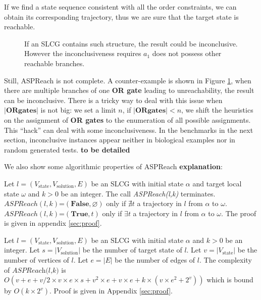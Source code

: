 If we find a state sequence consistent with all the order constraints, we can obtain its corresponding trajectory, thus we are sure that the target state is reachable.

\begin{figure}[ht]
    \centering
    
    \caption[Counterexample of ASPReach]{If an SLCG contains such structure, the result could be inconclusive.
    However the inconclusiveness requires $a_1$ does not possess other reachable branches.}
    \label{fig:lcgInconc}
\end{figure}
Still, ASPReach is not complete.
A counter-example is shown in Figure \ref{fig:lcgInconc}, when there are multiple branches of one \textbf{OR gate} leading to unreachability, the result can be inconclusive.
There is a tricky way to deal with this issue when $\mathbf{|OR gates|}$ is not big: we set a limit $n$, if $\mathbf{|OR gates|}<n$, we shift the heuristics on the assignment of \textbf{OR gates} to the enumeration of all possible assignments.
This ``hack'' can deal with some inconclusiveness.
In the benchmarks in the next section, inconclusive instances appear neither in biological examples nor in random generated tests. \textbf{to be detailed}

We also show some algorithmic properties of ASPReach \textbf{explanation}:

\begin{theorem}

    Let $l=(V_{\mathrm{state}}, V_{\mathrm{solution}}, E)$ be an SLCG with initial state $\alpha$ and target local state $\omega$ and $k > 0$ be an integer.
    The call \textit{ASPReach(l,k)} terminates.\\
    $ASPReach(l,k)$=$(\mathbf{False},\varnothing)$ only if $\nexists t$ a trajectory in $l$ from $\alpha$ to $\omega$.\\
    $ASPReach(l,k)$=$(\mathbf{True},t)$ only if $\exists t$ a trajectory in $l$ from $\alpha$ to $\omega$.
    The proof is given in appendix \ref{sec:proof}.
\end{theorem}

\begin{theorem}
    Let $l=(V_{\mathrm{state}}, V_{\mathrm{solution}}, E)$ be an SLCG with initial state $\alpha$ and $k > 0$ be an integer.
    Let $s=|V_{\mathrm{solution}}|$ be the number of target state of $l$.
    Let $v = |V_{\mathrm{state}}|$ be the number of vertices of $l$.
    Let $e=|E|$ be the number of edges of $l$.
    The complexity of $\textit{ASPReach(l,k)}$ is $O(v + e + v/2 \times v \times e \times s + v^{2} \times e + v \times e + k \times (v \times e^{2} + 2^{v}))$ which is bound by $O(k \times 2^{v})$.
    Proof is given in Appendix \ref{sec:proof}.
\end{theorem}
